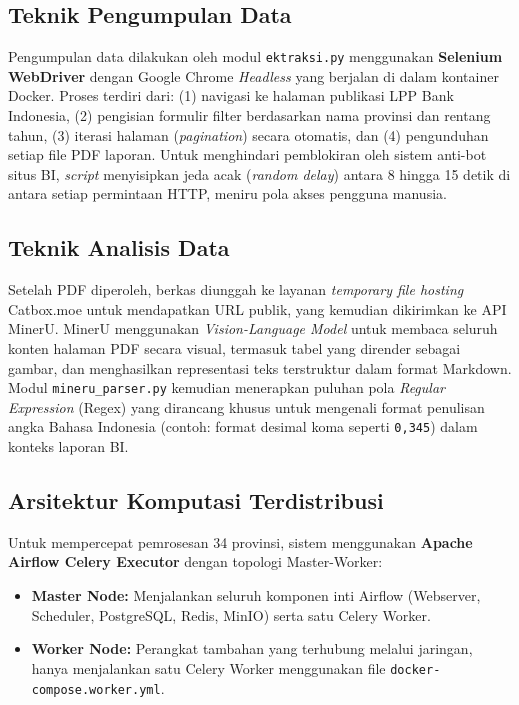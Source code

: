 \documentclass[10pt, a4paper, twocolumn]{article}
\begin{document}
\subsection{Teknik Pengumpulan Data}

Pengumpulan data dilakukan oleh modul \texttt{ektraksi.py} menggunakan \textbf{Selenium WebDriver} dengan Google Chrome \textit{Headless} yang berjalan di dalam kontainer Docker. Proses terdiri dari: (1) navigasi ke halaman publikasi LPP Bank Indonesia, (2) pengisian formulir filter berdasarkan nama provinsi dan rentang tahun, (3) iterasi halaman (\textit{pagination}) secara otomatis, dan (4) pengunduhan setiap file PDF laporan. Untuk menghindari pemblokiran oleh sistem anti-bot situs BI, \textit{script} menyisipkan jeda acak (\textit{random delay}) antara 8 hingga 15 detik di antara setiap permintaan HTTP, meniru pola akses pengguna manusia.

\subsection{Teknik Analisis Data}

Setelah PDF diperoleh, berkas diunggah ke layanan \textit{temporary file hosting} Catbox.moe untuk mendapatkan URL publik, yang kemudian dikirimkan ke API MinerU. MinerU menggunakan \textit{Vision-Language Model} untuk membaca seluruh konten halaman PDF secara visual, termasuk tabel yang dirender sebagai gambar, dan menghasilkan representasi teks terstruktur dalam format Markdown. Modul \texttt{mineru\_parser.py} kemudian menerapkan puluhan pola \textit{Regular Expression} (Regex) yang dirancang khusus untuk mengenali format penulisan angka Bahasa Indonesia (contoh: format desimal koma seperti \texttt{0,345}) dalam konteks laporan BI.

\subsection{Arsitektur Komputasi Terdistribusi}

Untuk mempercepat pemrosesan 34 provinsi, sistem menggunakan \textbf{Apache Airflow Celery Executor} dengan topologi Master-Worker:

\begin{itemize}[leftmargin=*]
  \item \textbf{Master Node:} Menjalankan seluruh komponen inti Airflow (Webserver, Scheduler, PostgreSQL, Redis, MinIO) serta satu Celery Worker.
  \item \textbf{Worker Node:} Perangkat tambahan yang terhubung melalui jaringan, hanya menjalankan satu Celery Worker menggunakan file \texttt{docker-compose.worker.yml}.
\end{itemize}
\end{document}
